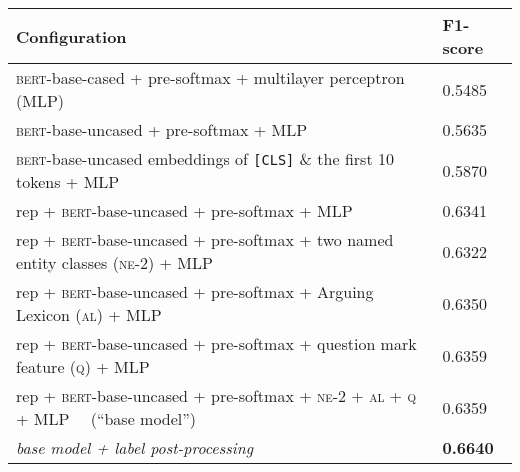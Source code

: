 \renewcommand\arraystretch{1.1}
\begin{tabular}{@{} l R @{}}
\toprule
\textbf{Configuration}     & \textbf{F1-score}     \\
\midrule
\textsc{bert}-base-cased + pre-softmax + multilayer perceptron (MLP) & 0.5485\\
\textsc{bert}-base-uncased + pre-softmax + MLP & 0.5635
\\ %
\hline
\textsc{bert}-base-uncased embeddings of \texttt{[CLS]} \& the first 10 tokens + MLP & 0.5870\\
\hline
rep + \textsc{bert}-base-uncased + pre-softmax + MLP & 0.6341 \\
\hline
rep + \textsc{bert}-base-uncased + pre-softmax + two named entity classes (\textsc{ne-2}) + MLP  & 0.6322\\ 
rep + \textsc{bert}-base-uncased + pre-softmax + Arguing Lexicon (\textsc{al}) + MLP & 0.6350 \\
rep + \textsc{bert}-base-uncased + pre-softmax + question mark feature (\textsc{q}) + MLP  & 0.6359\\
rep + \textsc{bert}-base-uncased + pre-softmax + \textsc{ne-2} + \textsc{al} + \textsc{q} + MLP ~~(``base model'') & 0.6359 \\ 
\hline
\textit{base model + label post-processing} & \textbf{0.6640} \\
\bottomrule
\end{tabular}